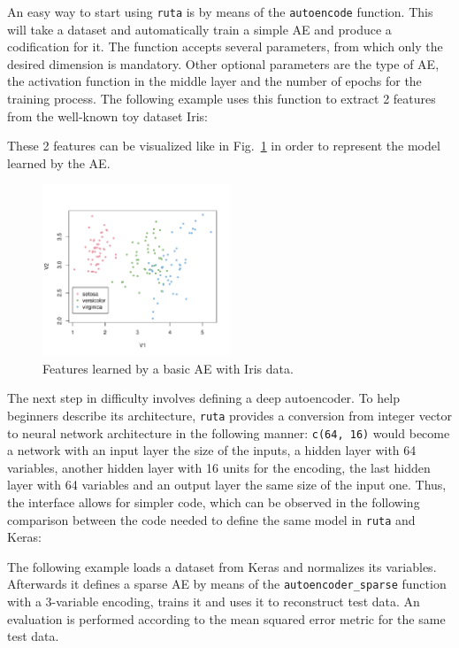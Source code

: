 An easy way to start using \texttt{ruta} is by means of the \texttt{autoencode} function. This will take a dataset and  automatically train a simple AE and produce a codification for it. The function accepts several parameters, from which only the desired dimension is mandatory. Other optional parameters are the type of AE, the activation function in the middle layer and the number of epochs for the training process. The following example uses this function to extract 2 features from the well-known toy dataset Iris:



These 2 features can be visualized like in Fig.~\ref{p2fig.iris} in order to represent the model learned by the AE.

\begin{figure}[ht]
  \centering
  \includegraphics[width=0.5\textwidth]{iris.pdf}
  \caption{Features learned by a basic AE with Iris data.}
  \label{p2fig.iris}
\end{figure}

{The next step in difficulty involves defining a deep autoencoder. To help beginners describe its architecture, \texttt{ruta} provides a conversion from integer vector to neural network architecture in the following manner: \texttt{c(64, 16)} would become a network with an input layer the size of the inputs, a hidden layer with 64 variables, another hidden layer with 16 units for the encoding, the last hidden layer with 64 variables and an output layer the same size of the input one. Thus, the interface allows for simpler code, which can be observed in the following comparison between the code needed to define the same model in \texttt{ruta} and Keras:
}



The following example loads a dataset from Keras and normalizes its variables. Afterwards it defines a sparse AE by means of the \texttt{autoencoder\_sparse} function with a 3-variable encoding, trains it and uses it to reconstruct test data. An evaluation is performed according to the mean squared error metric for the same test data.

